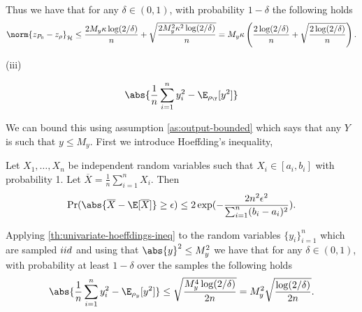 Thus we have that for any \(\delta \in (0, 1)\), with  probability \(1 -
\delta\) the following holds
\begin{equation}
  \label{eq:zs_RKHS_hoeffding}
  \norm{z_{\poolset_0} - z_{\rho}}_{\rkhs{H}} \leq \frac{2 M_y \kappa \log(2/\delta)}{n} + \sqrt{\frac{2 M_y^2 \kappa^2 \log(2/\delta)}{n}} = M_y \kappa \left(\frac{2\log(2/\delta)}{n} + \sqrt{\frac{2\log(2/\delta)}{n}} \right).
\end{equation}


\begin{description}
\item[{(iii)}] 
\end{description}
\begin{equation*}
  \abs{\frac{1}{n} \sum_{i=1}^n y_i^2 - \E_{\rho_{\Y}}[y^2]}
\end{equation*}

We can bound this using assumption \ref{as:output-bounded} which says that any
\(Y\) is such that \(y \leq M_y\). First we introduce Hoeffding's inequality,
\begin{theorem}
  \label{th:univariate-hoeffdings-ineq}
  Let \(X_{1}, \dots, X_{n}\) be independent random variables such that \(X_{i}
  \in [a_{i}, b_{i}]\) with probability 1. Let \(\overline{X} = \frac{1}{n}
  \sum_{i=1}^n X_i\). Then
  \begin{equation}
    \label{eq:univariate-hoeffdings-ineq}
    \Pr(\abs{\overline{X} - \E[\overline{X}]} \geq \epsilon) \leq 2 \exp(-\frac{2n^2\epsilon^2}{\sum_{i=1}^n(b_i - a_i)^2}).
  \end{equation}
\end{theorem}
Applying \ref{th:univariate-hoeffdings-ineq} to the random variables
\(\{y_{i}\}_{i=1}^{n}\) which are sampled \(iid\) and using that \(\abs{y}^{2}
\leq M_{y}^{2}\) we have that for any \(\delta \in (0, 1)\), with probability at
least \(1 - \delta\) over the samples the following holds
\begin{equation}
  \label{eq:y2s_hoeffding}
  \abs{\frac{1}{n} \sum_{i=1}^n y_i^2 - \E_{\rho_{y}}[y^2]} \leq \sqrt{\frac{M_y^4 \log(2/\delta)}{2n}} = M_y^2\sqrt{\frac{\log(2/\delta)}{2n}}.
\end{equation}

